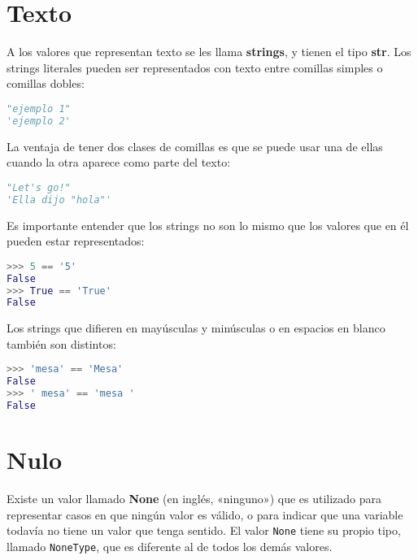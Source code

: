 \section{Texto}

A los valores que representan texto se les llama \textbf{strings}, y
tienen el tipo \textbf{str}.
Los strings literales pueden ser representados con texto entre comillas
simples o comillas dobles:

\begin{lstlisting}[language=py]
"ejemplo 1"
'ejemplo 2'
\end{lstlisting}

La ventaja de tener dos clases de comillas es que se puede usar una de
ellas cuando la otra aparece como parte del texto:

\begin{lstlisting}[language=py]
"Let's go!"
'Ella dijo "hola"'
\end{lstlisting}

Es importante entender que los strings no son lo mismo que los valores
que en él pueden estar representados:

\begin{lstlisting}[language=py]
>>> 5 == '5'
False
>>> True == 'True'
False
\end{lstlisting}

Los strings que difieren en mayúsculas y minúsculas
o en espacios en blanco
también son distintos:

\begin{lstlisting}[language=py]
>>> 'mesa' == 'Mesa'
False
>>> ' mesa' == 'mesa '
False
\end{lstlisting}

\section{Nulo}

Existe un valor llamado \textbf{None} (en inglés, «ninguno») que es
utilizado para representar casos en que ningún valor es válido, o para
indicar que una variable todavía no tiene un valor que tenga sentido.
El valor \lstinline!None! tiene su propio tipo, llamado
\lstinline!NoneType!, que es diferente al de todos los demás valores.
